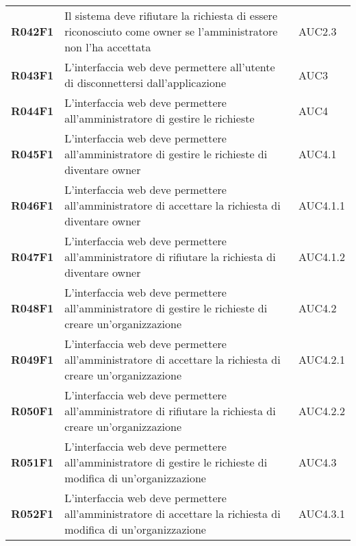 \documentclass[../analisi-dei-requisiti.tex]{subfiles}
\begin{document}
\begin{longtable}[H]{>{\centering\bfseries}m{3cm} >{\centering}m{10cm} >{\centering\arraybackslash}m{3cm}}
  R042F1                  & Il sistema deve rifiutare la richiesta di essere riconosciuto come owner se l'amministratore non l'ha accettata                                & AUC2.3                        \\
  R043F1                  & L'interfaccia web deve permettere all'utente di disconnettersi dall'applicazione                                                               & AUC3                          \\
  R044F1                  & L'interfaccia web deve permettere all'amministratore di gestire le richieste                                                                   & AUC4                          \\
  R045F1                  & L'interfaccia web deve permettere all'amministratore di gestire le richieste di diventare owner                                                & AUC4.1                        \\
  R046F1                  & L'interfaccia web deve permettere all'amministratore di accettare la richiesta di diventare owner                                              & AUC4.1.1                      \\
  R047F1                  & L'interfaccia web deve permettere all'amministratore di rifiutare la richiesta di diventare owner                                              & AUC4.1.2                      \\
  R048F1                  & L'interfaccia web deve permettere all'amministratore di gestire le richieste di creare un'organizzazione                                       & AUC4.2                        \\
  R049F1                  & L'interfaccia web deve permettere all'amministratore di accettare la richiesta di creare un'organizzazione                                     & AUC4.2.1                      \\
  R050F1                  & L'interfaccia web deve permettere all'amministratore di rifiutare la richiesta di creare un'organizzazione                                     & AUC4.2.2                      \\
  R051F1                  & L'interfaccia web deve permettere all'amministratore di gestire le richieste di modifica di un'organizzazione                                  & AUC4.3                        \\
  R052F1                  & L'interfaccia web deve permettere all'amministratore di accettare la richiesta di modifica di un'organizzazione                                & AUC4.3.1                      \\

\end{longtable}
\end{document}
